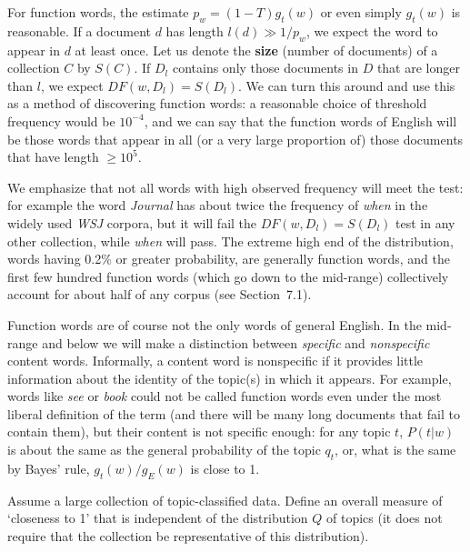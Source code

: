 For function words, the estimate $p_w = (1-T) g_t(w)$ or even simply $g_t(w)$
is reasonable.  If a document $d$ has length $l(d) \gg 1/p_w$, we expect the word
to appear in $d$ at least once. Let us denote the {\bf size} (number of
documents) of a collection $C$ by $S(C)$. If $D_l$ contains only those
documents in $D$ that are longer than $l$, we expect $DF(w,D_l)=S(D_l)$. We
can turn this around and use this as a method of discovering function words: a
reasonable choice of threshold frequency would be $10^{-4}$, and we can say
that the function words of English will be those words that appear in all (or
a very large proportion of) those documents that have length $\geq 10^5$.

We emphasize that not all words with high observed frequency will meet the
test: for example the word {\it Journal} has about twice the frequency of {\it
  when} in the widely used {\it WSJ} corpora, but it will fail the
$DF(w,D_l)=S(D_l)$ test in any other collection, while {\it when} will
pass. The extreme high end of the distribution, words having 0.2\% or greater
probability, are generally function words, and the first few hundred function
words (which go down to the mid-range) collectively account for about half of
any corpus (see Section~7.1).

Function words are of course not the only words of general English. In the
mid-range and below we will make a distinction between {\it specific} and {\it
  nonspecific} content words. Informally, a content word is nonspecific if it
provides little information about the identity of the topic(s) in which it
appears. For example, words like {\it see} or {\it book} could not be called
function words even under the most liberal definition of the term (and there
will be many long documents that fail to contain them), but their content is
not specific enough: for any topic $t$, $P(t|w)$ is about the same as the
general probability of the topic $q_t$, or, what is the same by Bayes' rule,
$g_t(w)/g_E(w)$ is close to 1.

\smallskip{} Assume a large collection of
topic-classified data. Define an overall measure of `closeness to 1' that is
independent of the distribution $Q$ of topics (it does not require that the
collection be representative of this distribution).

